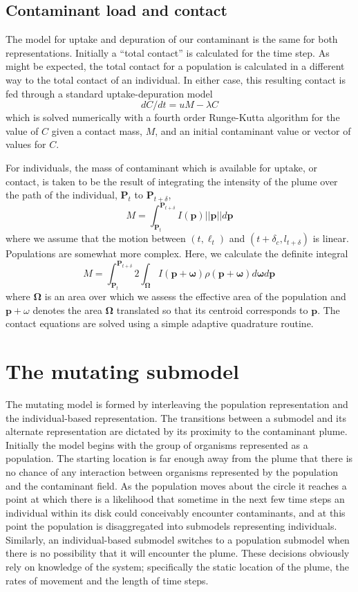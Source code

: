 \documentclass{article}
\newcommand{\tmmathbf}[1]{\ensuremath{\boldsymbol{#1}}}
\begin{document}
\subsection{Contaminant load and contact}

The model for uptake and depuration of our contaminant is the same for both
representations. Initially a ``total contact'' is calculated for the time
step. As might be expected, the total contact for a population is calculated
in a different way to the total contact of an individual. In either case, this
resulting contact is fed through a standard uptake-depuration model
\[ d C / d t = u M - \lambda C \]
which is solved numerically with a fourth order Runge-Kutta algorithm for the
value of $C$ given a contact mass, $M$, and an initial contaminant value or
vector of values for $C$.

For individuals, the mass of contaminant which is available for uptake, or
contact, is taken to be the result of integrating the intensity of the plume
over the path of the individual, $\tmmathbf{P}_t$ to $\tmmathbf{P}_{t +
\delta}$,
\[ M = \int_{\tmmathbf{P}_t}^{\tmmathbf{P}_{t + \delta_{}}} I ( \tmmathbf{p})
   ||\tmmathbf{p}|| d \tmmathbf{p} \]
where we assume that the motion between $(t, \ell_t)$ and $(t + \delta_c, l_{t
+ \delta})$ is linear. Populations are somewhat more complex. Here, we
calculate the definite integral
\[ M = \int_{\tmmathbf{P}_t}^{\tmmathbf{P}_{t + \delta}} 2
   \int_{\tmmathbf{\Omega}} I ( \tmmathbf{p +} \tmmathbf{\omega}) \rho (
   \tmmathbf{p} + \tmmathbf{\omega}) d \tmmathbf{\omega} d \tmmathbf{p}^{_{}}
\]
where $\tmmathbf{\Omega}$ is an area over which we assess the effective area
of the population and $\tmmathbf{p}+ \omega$ denotes the area
$\tmmathbf{\Omega}$ translated so that its centroid corresponds to
$\tmmathbf{p}$. The contact equations are solved using a simple adaptive
quadrature routine.

\section{The mutating submodel}

The mutating model is formed by interleaving the population representation and
the individual-based representation. The transitions between a submodel and
its alternate representation are dictated by its proximity to the contaminant
plume. Initially the model begins with the group of organisms represented as a
population. The starting location is far enough away from the plume that there
is no chance of any interaction between organisms represented by the
population and the contaminant field. As the population moves about the circle
it reaches a point at which there is a likelihood that sometime in the next
few time steps an individual within its disk could conceivably encounter
contaminants, and at this point the population is disaggregated into submodels
representing individuals. Similarly, an individual-based submodel switches to
a population submodel when there is no possibility that it will encounter the
plume. These decisions obviously rely on knowledge of the system; specifically
the static location of the plume, the rates of movement and the length of time
steps.
\end{document}
